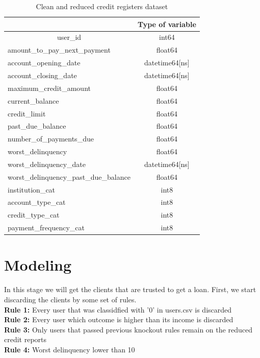 \documentclass[a4paper,12pt]{article}
\begin{document}
\begin{table}[h!]
  \centering
  \caption{Clean and reduced credit registers dataset}
    \begin{tabular}{|l|c|}
    \hline
    \rowcolor[rgb]{ .631,  .325,  .725} \multicolumn{1}{|c|}{\textcolor[rgb]{ 1,  1,  1}{Variable}} & \textcolor[rgb]{ 1,  1,  1}{Type of variable} \\
    \hline
    \multicolumn{1}{|c|}{user\_id} & int64 \\
    \hline
    amount\_to\_pay\_next\_payment & float64 \\
    \hline
    account\_opening\_date & datetime64[ns] \\
    \hline
    account\_closing\_date & datetime64[ns] \\
    \hline
    maximum\_credit\_amount & float64 \\
    \hline
    current\_balance & float64 \\
    \hline
    credit\_limit & float64 \\
    \hline
    past\_due\_balance & float64 \\
    \hline
    number\_of\_payments\_due & float64 \\
    \hline
    worst\_delinquency & float64 \\
    \hline
    worst\_delinquency\_date & datetime64[ns] \\
    \hline
    worst\_delinquency\_past\_due\_balance & float64 \\
    \hline
    institution\_cat & int8 \\
    \hline
    account\_type\_cat & int8 \\
    \hline
    credit\_type\_cat & int8 \\
    \hline
    payment\_frequency\_cat & int8 \\
    \hline
    \end{tabular}%
  \label{tab:RCRtable}%
\end{table}\newpage






\section{Modeling}
In this stage we will get the clients that are trusted to get a loan. First, we start discarding the clients by some set of rules.\\
\textbf{Rule 1:} Every user that was classidfied with '0' in users.csv is discarded\\
\textbf{Rule 2:} Every user which outcome is higher than its income is discarded\\
\textbf{Rule 3:} Only users that passed previous knockout rules remain on the reduced credit reports\\
\textbf{Rule 4:} Worst delinquency lower than 10\\
\end{document}
